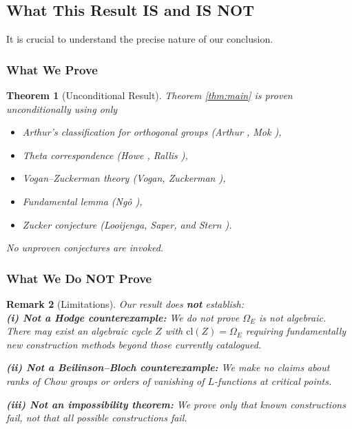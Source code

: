 \documentclass[12pt]{amsart}
\newtheorem{theorem}{Theorem}[section]
\newtheorem{remark}[theorem]{Remark}
\theoremstyle{definition}
\begin{document}
\subsection{What This Result IS and IS NOT}

It is crucial to understand the precise nature of our conclusion.

\subsubsection{What We Prove}

\begin{theorem}[Unconditional Result]\label{thm:unconditional}
Theorem \ref{thm:main} is proven unconditionally using only
\begin{itemize}
\item Arthur's classification for orthogonal groups (Arthur \cite{Arthur}, Mok \cite{Mok}),
\item Theta correspondence (Howe \cite{Howe}, Rallis \cite{Rallis}),
\item Vogan--Zuckerman theory (Vogan, Zuckerman \cite{Vogan-Zuckerman}),
\item Fundamental lemma (Ngô \cite{Ngo}),
\item Zucker conjecture (Looijenga, Saper, and Stern \cite{Looijenga-Saper-Stern}).
\end{itemize}
No unproven conjectures are invoked.
\end{theorem}

\subsubsection{What We Do NOT Prove}

\begin{remark}[Limitations]\label{rem:limitations}
Our result does \textbf{not} establish:\\

\textbf{(i) Not a Hodge counterexample:} We do not prove $\Omega_E$ is not algebraic. There may exist an algebraic cycle $Z$ with $\mathrm{cl}(Z) = \Omega_E$ requiring fundamentally new construction methods beyond those currently catalogued.

\textbf{(ii) Not a Beilinson--Bloch counterexample:} We make no claims about ranks of Chow groups or orders of vanishing of $L$-functions at critical points.

\textbf{(iii) Not an impossibility theorem:} We prove only that \textit{known} constructions fail, not that \textit{all possible} constructions fail.
\end{remark}
\end{document}
